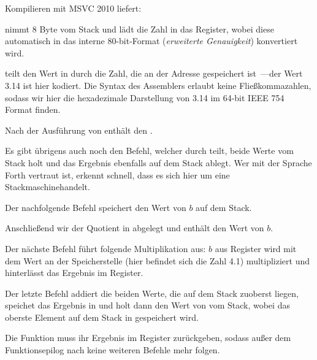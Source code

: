 
Kompilieren mit MSVC 2010 liefert:



\FLD nimmt 8 Byte vom Stack und lädt die Zahl in das  Register, wobei
diese automatisch in das interne 80-bit-Format (\emph{erweiterte Genauigkeit})
konvertiert wird.

\FDIV teilt den Wert in  durch die Zahl, die an der Adresse
 gespeichert ist~---der Wert 3.14 ist hier
kodiert.
Die Syntax des Assemblers erlaubt keine Fließkommazahlen, sodass wir hier die
hexadezimale Darstellung von 3.14 im 64-bit IEEE 754 Format finden.

Nach der Ausführung von \FDIV enthält  den .

Es gibt übrigens auch noch den \FDIVP Befehl, welcher  durch 
teilt, beide Werte vom Stack holt und das Ergebnis ebenfalls auf dem Stack
ablegt.
Wer mit der Sprache Forth \FNURLFORTH vertraut ist, erkennt schnell, dass es sich
hier um eine Stackmaschine\FNURLSTACK handelt.

Der nachfolgende \FLD Befehl speichert den Wert von $b$ auf dem Stack.

Anschließend wir der Quotient in  abgelegt und  enthält den Wert von
$b$.

Der nächste \FMUL Befehl führt folgende Multiplikation aus: $b$ aus Register
 wird mit dem Wert an der Speicherstelle 
(hier befindet sich die Zahl 4.1) multipliziert und hinterlässt das Ergebnis im
 Register.

Der letzte \FADDP Befehl addiert die beiden Werte, die auf dem Stack zuoberst
liegen, speichet das Ergebnis in  und holt dann den Wert von  vom
Stack, wobei das oberste Element auf dem Stack in  gespeichert wird.

Die Funktion muss ihr Ergebnis im  Register zurückgeben, sodass außer dem
Funktionsepilog nach \FADDP keine weiteren Befehle mehr folgen.



